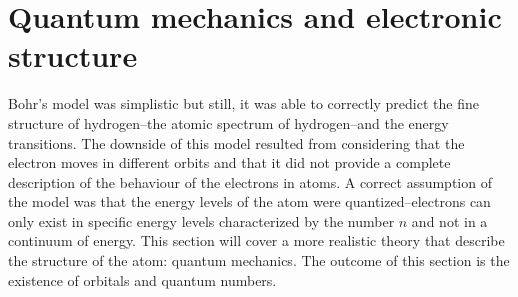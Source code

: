 \documentclass[main.tex]{subfiles}
\begin{document}
\section{Quantum mechanics and electronic structure}
Bohr's model was simplistic but still, it was able to correctly predict the fine structure of hydrogen--the atomic spectrum of hydrogen--and the energy transitions. The downside of this model resulted from considering that the electron moves in different orbits and that it did not provide a complete description of the behaviour of the electrons in atoms. A correct assumption of the model was that the energy levels of the atom were quantized--electrons can only exist in specific energy levels characterized by the number $n$ and not in a continuum of energy. This section will cover a more realistic theory that describe the structure of the atom: quantum mechanics. The outcome of this section is the existence of orbitals and quantum numbers.
\sloppy
\end{document}
